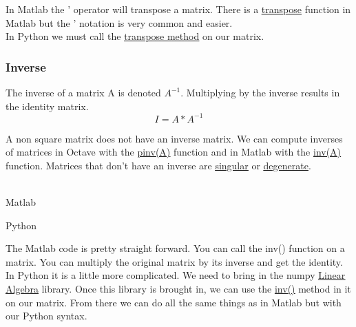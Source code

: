 In Matlab the ' operator will transpose a matrix.  There is a \underline{\href{https://www.mathworks.com/help/matlab/ref/transpose.html}{transpose}} function in Matlab but the ' notation is very common and easier.\\

In Python we must call the \underline{\href{https://docs.scipy.org/doc/numpy/reference/generated/numpy.ndarray.transpose.html}{transpose method}} on our matrix.\\

\subsubsection{Inverse}

The inverse of a matrix A is denoted $A^{-1}$.
Multiplying by the inverse results in the identity matrix.  \\

\begin{equation}
I = A*A^{-1}
\end{equation}

A non square matrix does not have an inverse matrix. We can compute inverses of matrices in Octave with the \underline{\href{https://octave.sourceforge.io/octave/function/pinv.html}{pinv(A)}} function and in Matlab with the \underline{\href{https://www.mathworks.com/help/matlab/ref/inv.html}{inv(A)}} function. Matrices that don't have an inverse are \underline{\href{http://mathworld.wolfram.com/SingularMatrix.html}{singular}} or \underline{\href{https://www.encyclopediaofmath.org/index.php/Degenerate_matrix}{degenerate}}. \\

\newpage
​ \begin{multicols}{2}
  Matlab\\
  \columnbreak

  Python\\

\end{multicols}	

  The Matlab code is pretty straight forward.  You can call the inv() function on a matrix.  You can multiply the original matrix by its inverse and get the identity.\\

  In Python it is a little more complicated.  We need to bring in the numpy \underline{\href{https://docs.scipy.org/doc/numpy/reference/routines.linalg.html}{Linear Algebra}} library.  Once this library is brought in, we can use the \underline{\href{https://docs.scipy.org/doc/numpy/reference/generated/numpy.linalg.inv.html\#numpy.linalg.inv}{inv()}} method in it on our matrix.  From there we can do all the same things as in Matlab but with our Python syntax.\\
  
